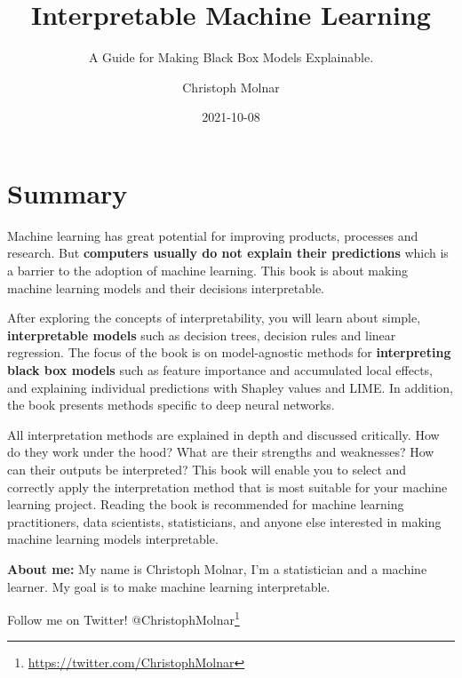 \documentclass[12pt,]{krantz}
\title{Interpretable Machine Learning}
\subtitle{A Guide for Making Black Box Models Explainable.}
\author{Christoph Molnar}
\date{2021-10-08}
\renewcommand{\href}[2]{#2\footnote{\url{#1}}}
\begin{document}
\maketitle

\thispagestyle{empty}

\setlength{\abovedisplayskip}{-5pt}
\setlength{\abovedisplayshortskip}{-5pt}

{
\hypersetup{linkcolor=black}
\setcounter{tocdepth}{1}
\tableofcontents
}
\chapter*{Summary}\label{summary}


Machine learning has great potential for improving products, processes
and research. But \textbf{computers usually do not explain their
predictions} which is a barrier to the adoption of machine learning.
This book is about making machine learning models and their decisions
interpretable.

After exploring the concepts of interpretability, you will learn about
simple, \textbf{interpretable models} such as decision trees, decision
rules and linear regression. The focus of the book is on model-agnostic
methods for \textbf{interpreting black box models} such as feature
importance and accumulated local effects, and explaining individual
predictions with Shapley values and LIME. In addition, the book presents
methods specific to deep neural networks.

All interpretation methods are explained in depth and discussed
critically. How do they work under the hood? What are their strengths
and weaknesses? How can their outputs be interpreted? This book will
enable you to select and correctly apply the interpretation method that
is most suitable for your machine learning project. Reading the book is
recommended for machine learning practitioners, data scientists,
statisticians, and anyone else interested in making machine learning
models interpretable.

\textbf{About me:} My name is Christoph Molnar, I'm a statistician and a
machine learner. My goal is to make machine learning interpretable.

Follow me on Twitter!
\href{https://twitter.com/ChristophMolnar}{@ChristophMolnar}
\end{document}
